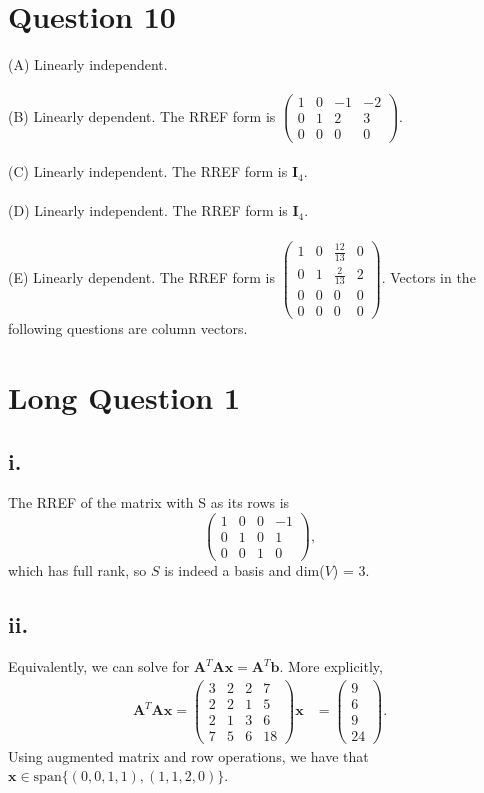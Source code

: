\documentclass{article}
\begin{document}
\section*{Question 10}
(A) Linearly independent. \\\\
(B) Linearly dependent.
The RREF form is 
$\begin{pmatrix}
1 & 0 & -1 & -2 \\
0 & 1 & 2 & 3 \\
0 & 0 & 0 & 0 
\end{pmatrix}$. \\\\
(C) Linearly independent.
The RREF form is $\mathbf{I}_4$.\\\\
(D) Linearly independent.
The RREF form is $\mathbf{I}_4$. \\\\
(E) Linearly dependent.
The RREF form is $\begin{pmatrix}
1 & 0 & \frac{12}{13} & 0 \\
0 & 1 & \frac{2}{13} & 2 \\
0 & 0 & 0 & 0 \\
0 & 0 & 0 & 0 
\end{pmatrix}$.
\newpage
Vectors in the following questions are column vectors.
\section*{Long Question 1}
\subsection*{i.}
The RREF of the matrix with S as its rows is
\[\begin{pmatrix}
    1 & 0 & 0 & -1 \\
    0 & 1 & 0 & 1 \\
    0 & 0 & 1 & 0
\end{pmatrix}, \]
which has full rank, so $S$ is indeed a basis and dim($V$) = 3.
\subsection*{ii.}
Equivalently, we can solve for $\mathbf{A}^T\mathbf{A}\mathbf{x} = \mathbf{A}^T\mathbf{b}$. More explicitly,
\begin{align*}
\mathbf{A}^T\mathbf{A}\mathbf{x} = 
    \begin{pmatrix}
        3 & 2 & 2 & 7 \\
        2 & 2 & 1 & 5 \\
        2 & 1 & 3 & 6 \\
        7 & 5 & 6 & 18
    \end{pmatrix}\mathbf{x}&=\begin{pmatrix}
        9 \\
        6 \\
        9 \\
        24
    \end{pmatrix}.
\end{align*}
Using augmented matrix and row operations, we have that $\mathbf{x} \in \text{span}\{(0,0,1,1), (1,1,2,0)\}$.
\end{document}
